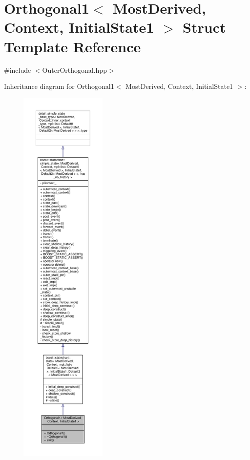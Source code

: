 \hypertarget{struct_orthogonal1}{}\section{Orthogonal1$<$ Most\+Derived, Context, Initial\+State1 $>$ Struct Template Reference}
\label{struct_orthogonal1}


{\ttfamily \#include $<$Outer\+Orthogonal.\+hpp$>$}



Inheritance diagram for Orthogonal1$<$ Most\+Derived, Context, Initial\+State1 $>$\+:
\nopagebreak
\begin{figure}[H]
\begin{center}
\leavevmode
\includegraphics[height=550pt]{struct_orthogonal1__inherit__graph}
\end{center}
\end{figure}


